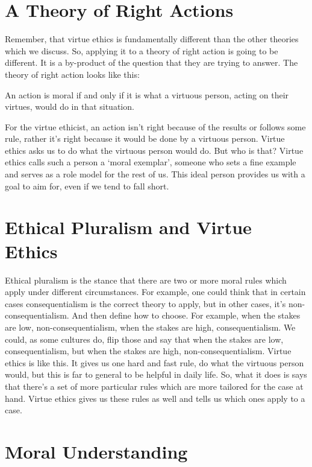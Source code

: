 \section{A Theory of Right Actions}

Remember, that virtue ethics is fundamentally different than the other theories which we discuss. So, applying it to a theory of right action is going to be different. It is a by-product of the question that they are trying to answer. The theory of right action looks like this:
\begin{center}
An action is moral if and only if it is what a virtuous person, acting on their virtues, would do in that situation.
\end{center}
For the virtue ethicist, an action isn’t right because of the results or follows some rule, rather it’s right because it would be done by a virtuous person. Virtue ethics asks us to do what the virtuous person would do. But who is that? Virtue ethics calls such a person a ‘moral exemplar’, someone who sets a fine example and serves as a role model for the rest of us. This ideal person provides us with a goal to aim for, even if we tend to fall short.
\section{Ethical Pluralism and Virtue Ethics}

Ethical pluralism is the stance that there are two or more moral rules which apply under different circumstances. For example, one could think that in certain cases consequentialism is the correct theory to apply, but in other cases, it’s non-consequentialism. And then define how to choose. For example, when the stakes are low, non-consequentialism, when the stakes are high, consequentialism. We could, as some cultures do, flip those and say that when the stakes are low, consequentialism, but when the stakes are high, non-consequentialism. Virtue ethics is like this. It gives us one hard and fast rule, do what the virtuous person would, but this is far to general to be helpful in daily life. So, what it does is says that there’s a set of more particular rules which are more tailored for the case at hand. Virtue ethics gives us these rules as well and tells us which ones apply to a case.

\section{Moral Understanding}

